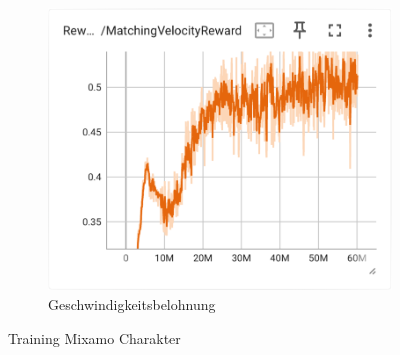 \begin{figure}[H]
\begin{subfigure}{.49\textwidth}
    \end{subfigure}
    \begin{subfigure}{.49\textwidth}
      \centering  
      \includegraphics[width=\textwidth]{img/106_vel_reward}
      \caption{Geschwindigkeitsbelohnung}
      \label{fig:106_vel_reward}
    \end{subfigure}
 \caption{Training Mixamo Charakter}
  \label{fig:training_mixamo_charakter}
\end{figure}